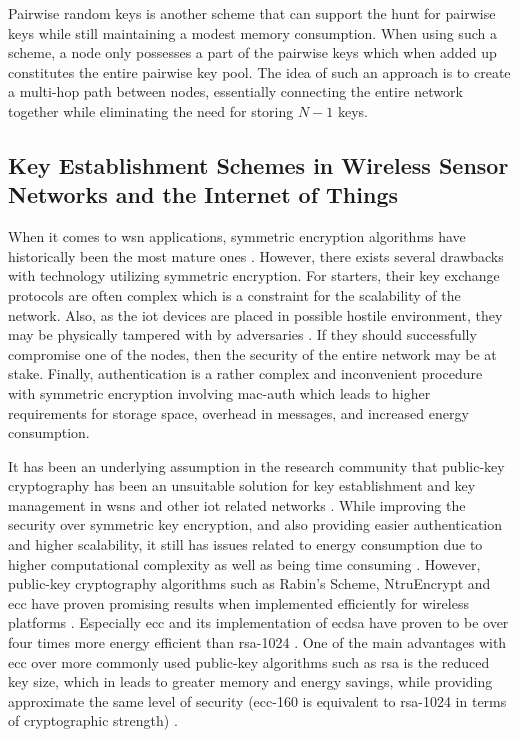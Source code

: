 Pairwise random keys is another scheme that can support the hunt for pairwise keys while still maintaining a modest memory consumption. When using such a scheme, a node only possesses a part of the pairwise keys which when added up constitutes the entire pairwise key pool. The idea of such an approach is to create a multi-hop path between nodes, essentially connecting the entire network together while eliminating the need for storing $N-1$ keys.



\subsection{Key Establishment Schemes in Wireless Sensor Networks and the Internet of Things}

When it comes to \gls{wsn} applications, symmetric encryption algorithms have historically been the most mature ones \citep{Jing2014}. However, there exists several drawbacks with technology utilizing symmetric encryption. For starters, their key exchange protocols are often complex which is a constraint for the scalability of the network. Also, as the \gls{iot} devices are placed in possible hostile environment, they may be physically tampered with by adversaries \cite{krentz20136lowpan}. If they should successfully compromise one of the nodes, then the security of the entire network may be at stake. Finally, authentication is a rather complex and inconvenient procedure with symmetric encryption involving \gls{mac-auth} which leads to higher requirements for storage space, overhead in messages, and increased energy consumption.

It has been an underlying assumption in the research community that public-key cryptography has been an unsuitable solution for key establishment and key management in \gls{wsn}s and other \gls{iot} related networks \cite{wander2005energy} \cite{gaubatz2004public}. While improving the security over symmetric key encryption, and also providing easier authentication and higher scalability, it still has issues related to energy consumption due to higher computational complexity as well as being time consuming \citep{Eschenauer2002}. However, public-key cryptography algorithms such as Rabin's Scheme, NtruEncrypt and \gls{ecc} have proven promising results when implemented efficiently for wireless platforms \cite{Jing2014} \cite{gaubatz2004public}. Especially \gls{ecc} and its implementation of \gls{ecdsa} have proven to be over four times more energy efficient than \gls{rsa}-1024 \cite{wander2005energy}. One of the main advantages with \gls{ecc} over more commonly used public-key algorithms such as \gls{rsa} is the reduced key size, which in leads to greater memory and energy savings, while providing approximate the same level of security (\gls{ecc}-160 is equivalent to \gls{rsa}-1024 in terms of cryptographic strength) \cite{nist2016}.

